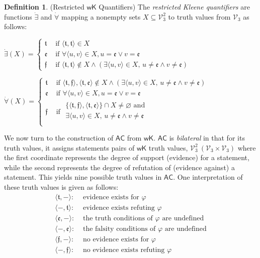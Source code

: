 \documentclass[letterpaper]{article} %
\theoremstyle{definition}
\theoremstyle{definition}
\newtheorem{definition}{Definition}
\theoremstyle{definition}
\theoremstyle{definition}
\theoremstyle{definition}
\newcommand{\vt}{\mathfrak{t}}
\newcommand{\vf}{\mathfrak{f}}
\newcommand{\vu}{\mathfrak{e}}
\begin{document}
\begin{definition}(Restricted $\mathsf{wK}$ Quantifiers)
    The \emph{restricted Kleene quantifiers} are functions $\dot{\exists}$ and $\dot{\forall}$ mapping a nonempty sets $X\subseteq\mathcal{V}_{3}^{2}$ to truth values from $\mathcal{V}_{3}$ as follows:
	
	\vspace{.1cm}

    {\small
	
	\noindent $\dot{\exists}(X)=\begin{cases}
	\vt & \mbox{ if }\langle\vt,\vt\rangle\in X\\
	\vu & \mbox{ if }\forall\langle u,v\rangle\in X, u=\vu\lor v=\vu\\
	\vf & \mbox{ if }\langle\vt,\vt\rangle\notin X \land (\exists \langle u,v\rangle\in X\mbox{, }u\neq\vu\land v\neq\vu)
	\end{cases}$

    	\noindent $\dot{\forall}(X)=\begin{cases}
	\vt & \mbox{ if }\langle\vt,\vf\rangle,\langle\vt,\vu\rangle\notin X \land (\exists \langle u,v\rangle\in X\mbox{, }u\neq\vu\land v\neq\vu)\\
	\vu & \mbox{ if } \forall\langle u,v\rangle\in X,u=\vu\lor v=\vu\\
	\vf & \mbox{ if }
    \begin{aligned}
    \lbrace\langle\vt,\vf\rangle,\langle\vt,\vu\rangle\rbrace\cap X\neq\varnothing \mbox{ and }\\ \exists \langle u,v\rangle\in X\mbox{, }u\neq\vu\land v\neq\vu\\
    \end{aligned}
	\end{cases}$
    }
\end{definition}
\endgroup
\noindent We now turn to the construction of $\mathsf{AC}$ from $\mathsf{wK}$. $\mathsf{AC}$ is \textit{bilateral} in that for its truth values, it assigns statements pairs of $\mathsf{wK}$ truth values, $\mathcal{V}^2_3 \: (\mathcal{V}_3 \times \mathcal{V}_3)$ where the first coordinate represents the degree of support (evidence) for a statement, while the second represents the degree of refutation of (evidence against) a statement. This yields nine possible truth values in $\mathsf{AC}$. One interpretation of these truth values is given as follows:
\begin{align*} \langle\vt,-\rangle: & \text{ evidence exists for } \varphi \\ 
\langle -,\vt\rangle: & \text{ evidence exists refuting } \varphi \\ 
\langle\vu,-\rangle: & \text{ the truth conditions of } \varphi \text{ are undefined} \\
\langle -,\vu\rangle: & \text{ the falsity conditions of } \varphi \text{ are undefined} \\ 
\langle\vf,-\rangle: & \text{ no evidence exists for } \varphi \\
\langle -,\vf\rangle: & \text{ no evidence exists refuting } \varphi 
\end{align*}
\end{document}
